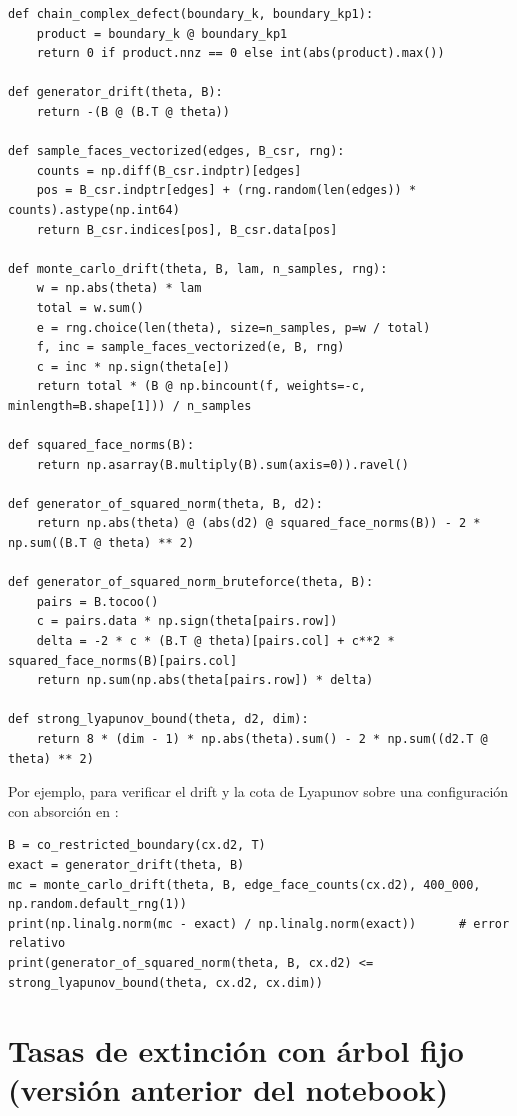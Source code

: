 \documentclass[11pt,a4paper]{article}
\theoremstyle{plain}
\theoremstyle{remark}
\newcommand{\fn}[1]{\texttt{\detokenize{#1}}}
\begin{document}
\begin{lstlisting}
def chain_complex_defect(boundary_k, boundary_kp1):
    product = boundary_k @ boundary_kp1
    return 0 if product.nnz == 0 else int(abs(product).max())

def generator_drift(theta, B):
    return -(B @ (B.T @ theta))

def sample_faces_vectorized(edges, B_csr, rng):
    counts = np.diff(B_csr.indptr)[edges]
    pos = B_csr.indptr[edges] + (rng.random(len(edges)) * counts).astype(np.int64)
    return B_csr.indices[pos], B_csr.data[pos]

def monte_carlo_drift(theta, B, lam, n_samples, rng):
    w = np.abs(theta) * lam
    total = w.sum()
    e = rng.choice(len(theta), size=n_samples, p=w / total)
    f, inc = sample_faces_vectorized(e, B, rng)
    c = inc * np.sign(theta[e])
    return total * (B @ np.bincount(f, weights=-c, minlength=B.shape[1])) / n_samples

def squared_face_norms(B):
    return np.asarray(B.multiply(B).sum(axis=0)).ravel()

def generator_of_squared_norm(theta, B, d2):
    return np.abs(theta) @ (abs(d2) @ squared_face_norms(B)) - 2 * np.sum((B.T @ theta) ** 2)

def generator_of_squared_norm_bruteforce(theta, B):
    pairs = B.tocoo()
    c = pairs.data * np.sign(theta[pairs.row])
    delta = -2 * c * (B.T @ theta)[pairs.col] + c**2 * squared_face_norms(B)[pairs.col]
    return np.sum(np.abs(theta[pairs.row]) * delta)

def strong_lyapunov_bound(theta, d2, dim):
    return 8 * (dim - 1) * np.abs(theta).sum() - 2 * np.sum((d2.T @ theta) ** 2)
\end{lstlisting}

Por ejemplo, para verificar el drift y la cota de Lyapunov sobre una configuración \fn{theta} con absorción en \fn{T}:

\begin{lstlisting}
B = co_restricted_boundary(cx.d2, T)
exact = generator_drift(theta, B)
mc = monte_carlo_drift(theta, B, edge_face_counts(cx.d2), 400_000, np.random.default_rng(1))
print(np.linalg.norm(mc - exact) / np.linalg.norm(exact))      # error relativo
print(generator_of_squared_norm(theta, B, cx.d2) <= strong_lyapunov_bound(theta, cx.d2, cx.dim))
\end{lstlisting}


\section{Tasas de extinción con árbol fijo (versión anterior del notebook)}\label{app:tasas}
\end{document}
